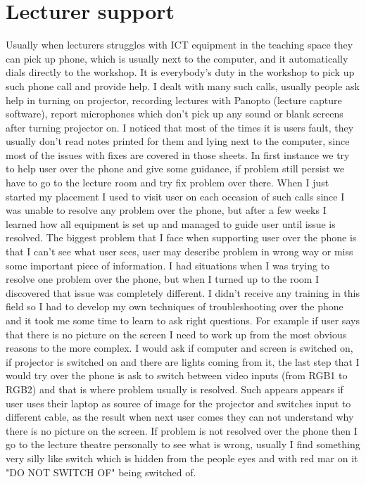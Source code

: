 \documentclass[10pt,a4paper,headinclude=true]{report}
\begin{document}
\section{Lecturer support}
Usually when lecturers struggles with ICT equipment in the teaching space they can pick up phone, which is usually next to the computer, and it automatically dials directly to the workshop. It is everybody's duty in the workshop to pick up such phone call and provide help. I dealt with many such calls, usually people ask help in turning on projector, recording lectures with Panopto (lecture capture software), report microphones which don't pick up any sound or blank screens after turning projector on. I noticed that most of the times it is users fault, they usually don't read notes printed for them and lying next to the computer, since most of the issues with fixes are covered in those sheets. In first instance we try to help user over the phone and give some guidance, if problem still persist we have to go to the lecture room and try fix problem over there. When I just started my placement I used to visit user on each occasion of such calls since I was unable to resolve any problem over the phone, but after a few weeks I learned how all equipment is set up and managed to guide user until issue is resolved. The biggest problem that I face when supporting user over the phone is that I can't see what user sees, user may describe problem in wrong way or miss some important piece of information. I had situations when I was trying to resolve one problem over the phone, but when I turned up to the room I discovered that issue was completely different. I didn't receive any training in this field so I had to develop my own techniques of troubleshooting over the phone and it took me some time to learn to ask right questions. For example if user says that there is no picture on the screen I need to work up from the most obvious reasons to the more complex. I would ask if computer and screen is switched on, if projector is switched on and there are lights coming from it, the last step that I would try over the phone is ask to switch between video inputs (from RGB1 to RGB2) and that is where problem usually is resolved. Such appears appears if user uses their laptop as source of image for the projector and switches input to different cable, as the result when next user comes they can not understand why there is no picture on the screen. If problem is not resolved over the phone then I go to the lecture theatre personally to see what is wrong, usually I find something very silly like switch which is hidden from the people eyes and with red mar on it "DO NOT SWITCH OF" being switched of.  
\end{document}
